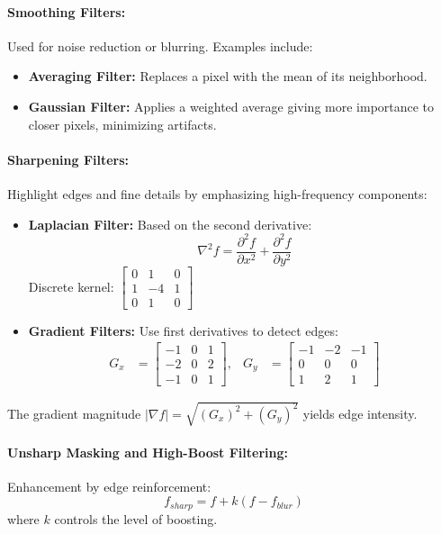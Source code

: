 \documentclass[12pt,a4paper]{AnantDocumentation}
\begin{document}
\paragraph{Smoothing Filters:}
Used for noise reduction or blurring. Examples include:
\begin{itemize}
\item \textbf{Averaging Filter:} Replaces a pixel with the mean of its neighborhood.
\item \textbf{Gaussian Filter:} Applies a weighted average giving more importance to closer pixels, minimizing artifacts.
\end{itemize}

\paragraph{Sharpening Filters:}
Highlight edges and fine details by emphasizing high-frequency components:
\begin{itemize}
\item \textbf{Laplacian Filter:} Based on the second derivative:
\begin{equation}
\nabla^2 f = \frac{\partial^2 f}{\partial x^2} + \frac{\partial^2 f}{\partial y^2}
\end{equation}
Discrete kernel: $\begin{bmatrix}0 & 1 & 0 \\ 1 & -4 & 1 \\ 0 & 1 & 0\end{bmatrix}$
\item \textbf{Gradient Filters:} Use first derivatives to detect edges:
\begin{align}
G_x &= \begin{bmatrix}-1 & 0 & 1 \\ -2 & 0 & 2 \\ -1 & 0 & 1\end{bmatrix}, & G_y &= \begin{bmatrix}-1 & -2 & -1 \\ 0 & 0 & 0 \\ 1 & 2 & 1\end{bmatrix}
\end{align}
\end{itemize}
The gradient magnitude $|\nabla f| = \sqrt{(G_x)^2 + (G_y)^2}$ yields edge intensity.

\paragraph{Unsharp Masking and High-Boost Filtering:}
Enhancement by edge reinforcement:
\begin{equation}
f_{sharp} = f + k(f - f_{blur})
\end{equation}
where $k$ controls the level of boosting.
\end{document}
